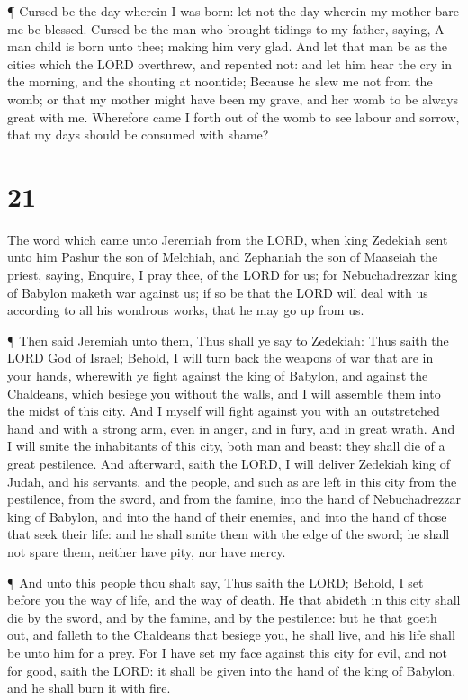  ¶ Cursed be the day wherein I was born: let not the day
wherein my mother bare me be blessed.  Cursed be the man
who brought tidings to my father, saying, A man child is born unto thee;
making him very glad.  And let that man be as the cities
which the LORD overthrew, and repented not: and let him hear the cry in
the morning, and the shouting at noontide;  Because he slew
me not from the womb; or that my mother might have been my grave, and
her womb to be always great with me.  Wherefore came I
forth out of the womb to see labour and sorrow, that my days should be
consumed with shame?

\hypertarget{section-20}{%
\section{21}\label{section-20}}

 The word which came unto Jeremiah from the LORD, when king
Zedekiah sent unto him Pashur the son of Melchiah, and Zephaniah the son
of Maaseiah the priest, saying,  Enquire, I pray thee, of
the LORD for us; for Nebuchadrezzar king of Babylon maketh war against
us; if so be that the LORD will deal with us according to all his
wondrous works, that he may go up from us.

 ¶ Then said Jeremiah unto them, Thus shall ye say to
Zedekiah:  Thus saith the LORD God of Israel; Behold, I will
turn back the weapons of war that are in your hands, wherewith ye fight
against the king of Babylon, and against the Chaldeans, which besiege
you without the walls, and I will assemble them into the midst of this
city.  And I myself will fight against you with an
outstretched hand and with a strong arm, even in anger, and in fury, and
in great wrath.  And I will smite the inhabitants of this
city, both man and beast: they shall die of a great pestilence.
 And afterward, saith the LORD, I will deliver Zedekiah king
of Judah, and his servants, and the people, and such as are left in this
city from the pestilence, from the sword, and from the famine, into the
hand of Nebuchadrezzar king of Babylon, and into the hand of their
enemies, and into the hand of those that seek their life: and he shall
smite them with the edge of the sword; he shall not spare them, neither
have pity, nor have mercy.

 ¶ And unto this people thou shalt say, Thus saith the LORD;
Behold, I set before you the way of life, and the way of death.
 He that abideth in this city shall die by the sword, and by
the famine, and by the pestilence: but he that goeth out, and falleth to
the Chaldeans that besiege you, he shall live, and his life shall be
unto him for a prey.  For I have set my face against this
city for evil, and not for good, saith the LORD: it shall be given into
the hand of the king of Babylon, and he shall burn it with fire.


